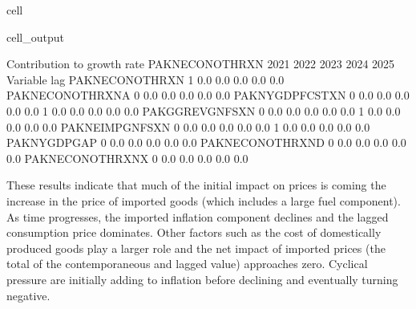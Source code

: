 \documentclass[letterpaper,10pt,english]{jupyterBook}
\begin{document}
\begin{sphinxuseclass}{cell}
\begin{sphinxVerbatimOutput}
\begin{sphinxuseclass}{cell_output}
\begin{sphinxVerbatim}[commandchars=\\\{\}]
 Contribution to growth rate PAKNECONOTHRXN
                            2021        2022        2023        2024        2025
Variable         lag                                                            
PAKNECONOTHRXN   \PYGZhy{}1        \PYGZhy{}0.0\PYGZpc{}       \PYGZhy{}0.0\PYGZpc{}       \PYGZhy{}0.0\PYGZpc{}       \PYGZhy{}0.0\PYGZpc{}       \PYGZhy{}0.0\PYGZpc{}
PAKNECONOTHRXN\PYGZus{}A  0        \PYGZhy{}0.0\PYGZpc{}       \PYGZhy{}0.0\PYGZpc{}       \PYGZhy{}0.0\PYGZpc{}       \PYGZhy{}0.0\PYGZpc{}       \PYGZhy{}0.0\PYGZpc{}
PAKNYGDPFCSTXN    0         0.0\PYGZpc{}        0.0\PYGZpc{}        0.0\PYGZpc{}        0.0\PYGZpc{}        0.0\PYGZpc{}
                 \PYGZhy{}1        \PYGZhy{}0.0\PYGZpc{}       \PYGZhy{}0.0\PYGZpc{}       \PYGZhy{}0.0\PYGZpc{}       \PYGZhy{}0.0\PYGZpc{}       \PYGZhy{}0.0\PYGZpc{}
PAKGGREVGNFSXN    0        \PYGZhy{}0.0\PYGZpc{}       \PYGZhy{}0.0\PYGZpc{}       \PYGZhy{}0.0\PYGZpc{}       \PYGZhy{}0.0\PYGZpc{}       \PYGZhy{}0.0\PYGZpc{}
                 \PYGZhy{}1        \PYGZhy{}0.0\PYGZpc{}       \PYGZhy{}0.0\PYGZpc{}       \PYGZhy{}0.0\PYGZpc{}       \PYGZhy{}0.0\PYGZpc{}       \PYGZhy{}0.0\PYGZpc{}
PAKNEIMPGNFSXN    0         0.0\PYGZpc{}        0.0\PYGZpc{}        0.0\PYGZpc{}        0.0\PYGZpc{}        0.0\PYGZpc{}
                 \PYGZhy{}1        \PYGZhy{}0.0\PYGZpc{}       \PYGZhy{}0.0\PYGZpc{}       \PYGZhy{}0.0\PYGZpc{}       \PYGZhy{}0.0\PYGZpc{}       \PYGZhy{}0.0\PYGZpc{}
PAKNYGDPGAP\PYGZus{}      0         0.0\PYGZpc{}        0.0\PYGZpc{}        0.0\PYGZpc{}        0.0\PYGZpc{}       \PYGZhy{}0.0\PYGZpc{}
PAKNECONOTHRXN\PYGZus{}D  0        \PYGZhy{}0.0\PYGZpc{}       \PYGZhy{}0.0\PYGZpc{}       \PYGZhy{}0.0\PYGZpc{}       \PYGZhy{}0.0\PYGZpc{}       \PYGZhy{}0.0\PYGZpc{}
PAKNECONOTHRXN\PYGZus{}X  0        \PYGZhy{}0.0\PYGZpc{}       \PYGZhy{}0.0\PYGZpc{}       \PYGZhy{}0.0\PYGZpc{}       \PYGZhy{}0.0\PYGZpc{}       \PYGZhy{}0.0\PYGZpc{}
\end{sphinxVerbatim}

\end{sphinxuseclass}\end{sphinxVerbatimOutput}

\end{sphinxuseclass}
\sphinxAtStartPar
These results indicate that much of the initial impact on prices is coming the increase in the price of imported goods (which includes a large fuel component). As time progresses, the imported inflation component declines and the lagged consumption price dominates.  Other factors such as the cost of domestically produced goods play a larger role and the net impact of imported prices (the total of the contemporaneous and lagged value) approaches zero. Cyclical pressure are initially adding to inflation before declining and eventually turning negative.
\end{document}
